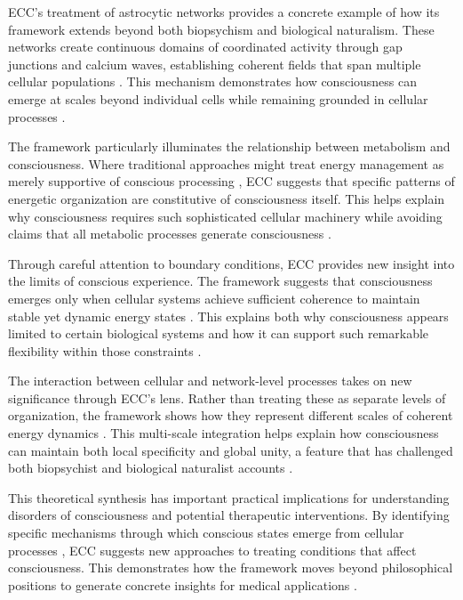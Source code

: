 ECC's treatment of astrocytic networks provides a concrete example of how its framework extends beyond both biopsychism and biological naturalism. These networks create continuous domains of coordinated activity through gap junctions and calcium waves, establishing coherent fields that span multiple cellular populations \cite{edwards2005consciousness}. This mechanism demonstrates how consciousness can emerge at scales beyond individual cells while remaining grounded in cellular processes \cite{thompson2010mind}.

The framework particularly illuminates the relationship between metabolism and consciousness. Where traditional approaches might treat energy management as merely supportive of conscious processing \cite{searle1992rediscovery}, ECC suggests that specific patterns of energetic organization are constitutive of consciousness itself. This helps explain why consciousness requires such sophisticated cellular machinery while avoiding claims that all metabolic processes generate consciousness \cite{margulis2000life}.

Through careful attention to boundary conditions, ECC provides new insight into the limits of conscious experience. The framework suggests that consciousness emerges only when cellular systems achieve sufficient coherence to maintain stable yet dynamic energy states \cite{varela1997patterns}. This explains both why consciousness appears limited to certain biological systems and how it can support such remarkable flexibility within those constraints \cite{godfrey2016other}.

The interaction between cellular and network-level processes takes on new significance through ECC's lens. Rather than treating these as separate levels of organization, the framework shows how they represent different scales of coherent energy dynamics \cite{lyon2015cognitive}. This multi-scale integration helps explain how consciousness can maintain both local specificity and global unity, a feature that has challenged both biopsychist and biological naturalist accounts \cite{clark2010supersizing}.

This theoretical synthesis has important practical implications for understanding disorders of consciousness and potential therapeutic interventions. By identifying specific mechanisms through which conscious states emerge from cellular processes \cite{deacon2011incomplete}, ECC suggests new approaches to treating conditions that affect consciousness. This demonstrates how the framework moves beyond philosophical positions to generate concrete insights for medical applications \cite{thompson2010mind}.

